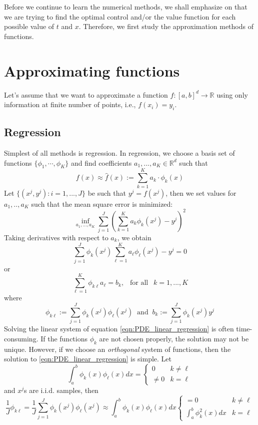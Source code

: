 \documentclass[11pt]{book}
\begin{document}
Before we continue to learn the numerical methods, we shall emphasize on that we are trying to find the optimal control and/or the value function for each possible value of $t$ and $x$. Therefore, we first study the approximation methods of functions. 

\section{Approximating functions}
Let's assume that we want to approximate a function $f:[a,b]^d\to\mathbb{R}$ using only information at finite number of points, i.e., $f(x_i)=y_i$.

\subsection{Regression}
Simplest of all methods is regression. In regression, we choose a basis set of functions $\{\phi_1,\cdots,\phi_K\}$ and find coefficients $a_1,...,a_K\in\mathbb{R}^d$ such that 
\[
f(x)\approx \hat{f}(x):=\sum_{k=1}^Ka_k\cdot \phi_k(x)
\]
Let $\{(x^j,y^j):i=1,...,J\}$ be such that $y^j=f(x^j)$, then we set values for $a_1,..,a_K$ such that the mean square error is minimized: 
\begin{equation}
\label{prob:inf_regresion}
\inf_{a_1,...,a_K}\sum_{j=1}^J\left(\sum_{k=1}^{K} a_k \phi_k(x^j)-y^j\right)^2
\end{equation}
Taking derivatives with respect to $a_k$, we obtain
\[
\sum_{j=1}^J\phi_{k}(x^j)\sum_{\ell=1}^{K} a_{\ell} \phi_{\ell}(x^j)-y^j=0
\]
or
\begin{equation}
    \label{eqn:PDE_linear_regression}
\sum_{\ell=1}^{K} \phi_{k\ell}a_{\ell}=b_{k},~~\text{ for all }~~k=1,...,K
\end{equation}
where
\[
\phi_{k\ell}:=\sum_{j=1}^J\phi_{k}(x^j)\phi_{\ell}(x^j)~\text{ and }~b_k:=\sum_{j=1}^J\phi_{k}(x^j)y^j
\]
Solving the linear system of equation \eqref{eqn:PDE_linear_regression} is often time-consuming. If the functions $\phi_k$ are not chosen properly, the solution may not be unique. However, if we choose an \emph{orthogonal} system of functions, then the solution to \eqref{eqn:PDE_linear_regression} is simple. Let 
\[
\int_a^b \phi_k(x)\phi_{\ell}(x)dx=
\begin{cases}
    0&k\neq\ell\\
    \neq0&k=\ell
\end{cases}
\]
and $x^j$s are i.i.d. samples, then
\[
\frac{1}{J}\phi_{k\ell}=\frac{1}{J}\sum_{j=1}^J\phi_{k}(x^j)\phi_{\ell}(x^j)\approx \int_a^b \phi_k(x)\phi_{\ell}(x)dx\begin{cases}
    =0&k\neq\ell\\
    \int_a^b \phi^2_k(x)dx&k=\ell
\end{cases}
\]
\end{document}
